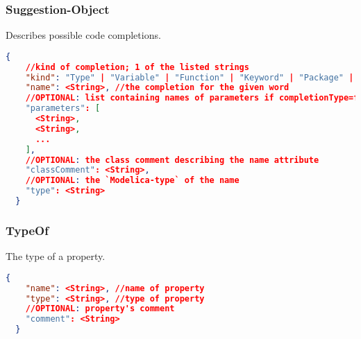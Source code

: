   \subsubsection{Suggestion-Object}
  Describes possible code completions.
  \newline{}
  \begin{lstlisting}[basicstyle=\small,language=json]
  {
    //kind of completion; 1 of the listed strings
    "kind": "Type" | "Variable" | "Function" | "Keyword" | "Package" | "Model" | "Class",
    "name": <String>, //the completion for the given word
    //OPTIONAL: list containing names of parameters if completionType=function
    "parameters": [
      <String>,
      <String>,
      ...
    ],
    //OPTIONAL: the class comment describing the name attribute
    "classComment": <String>,
    //OPTIONAL: the `Modelica-type` of the name
    "type": <String>
  }
  \end{lstlisting}


  \subsubsection{TypeOf}
  The type of a property.
  \newline{}
  \begin{lstlisting}[basicstyle=\small,language=json]
  {
    "name": <String>, //name of property
    "type": <String>, //type of property
    //OPTIONAL: property's comment
    "comment": <String>
  }
  \end{lstlisting}

